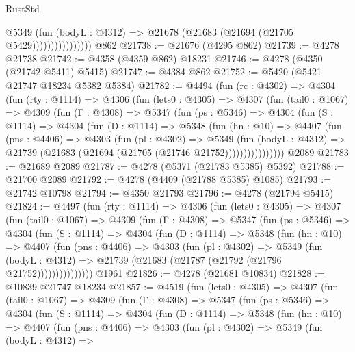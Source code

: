 \begin{lexlean}{RustStd}
\begin{coremodule}
                          @5349
                            (fun (bodyL : @4312) =>
                            @21678 (@21683 (@21694 (@21705 @5429))))))))))))))))
    @862
@21738 := @21676 (@4295 @862)
@21739 := @4278 @21738
@21742 := @4358 (@4359 @862) @18231
@21746 := @4278 (@4350 (@21742 @5411) @5415)
@21747 := @4384 @862
@21752 := @5420 (@5421 @21747 @18234 @5382 @5384)
@21782 := @4494
    (fun (rc : @4302) =>
    @4304
      (fun (rty : @1114) =>
      @4306
        (fun (lets0 : @4305) =>
        @4307
          (fun (tail0 : @1067) =>
          @4309
            (fun (Γ : @4308) =>
            @5347
              (fun (ps : @5346) =>
              @4304
                (fun (S : @1114) =>
                @4304
                  (fun (D : @1114) =>
                  @5348
                    (fun (hn : @10) =>
                    @4407
                      (fun (pns : @4406) =>
                      @4303
                        (fun (pl : @4302) =>
                        @5349
                          (fun (bodyL : @4312) =>
                          @21739 (@21683 (@21694 (@21705 (@21746 @21752))))))))))))))))
    @2089
@21783 := @21689 @2089
@21787 := @4278 (@5371 (@21783 @5385) @5392)
@21788 := @21700 @2089
@21792 := @4278 (@4409 (@21788 @5385) @1085)
@21793 := @21742 @10798
@21794 := @4350 @21793
@21796 := @4278 (@21794 @5415)
@21824 := @4497
    (fun (rty : @1114) =>
    @4306
      (fun (lets0 : @4305) =>
      @4307
        (fun (tail0 : @1067) =>
        @4309
          (fun (Γ : @4308) =>
          @5347
            (fun (ps : @5346) =>
            @4304
              (fun (S : @1114) =>
              @4304
                (fun (D : @1114) =>
                @5348
                  (fun (hn : @10) =>
                  @4407
                    (fun (pns : @4406) =>
                    @4303
                      (fun (pl : @4302) =>
                      @5349
                        (fun (bodyL : @4312) =>
                        @21739 (@21683 (@21787 (@21792 (@21796 @21752)))))))))))))))
    @1961
@21826 := @4278 (@21681 @10834)
@21828 := @10839 @21747 @18234
@21857 := @4519
    (fun (lets0 : @4305) =>
    @4307
      (fun (tail0 : @1067) =>
      @4309
        (fun (Γ : @4308) =>
        @5347
          (fun (ps : @5346) =>
          @4304
            (fun (S : @1114) =>
            @4304
              (fun (D : @1114) =>
              @5348
                (fun (hn : @10) =>
                @4407
                  (fun (pns : @4406) =>
                  @4303
                    (fun (pl : @4302) =>
                    @5349
                      (fun (bodyL : @4312) =>

\end{coremodule}
\end{lexlean}
